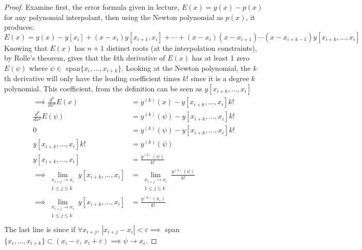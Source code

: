 \documentclass{article}
\begin{document}
\begin{enumerate}
\begin{enumerate}
                \begin{proof}
                    Examine first, the error formula given in lecture, $E(x) = y(x) - p(x)$ for any polynomial interpolant, then using the Newton polynomial as $p(x)$, it produces:
                    \[ E(x) = y(x) - y[x_i] + (x-x_i)y[x_{i+1},x_i] + \cdots + (x - x_i)(x - x_{i+1}) \cdots(x - x_{i + k-1})y[x_{i + k},\dots,x_i]\]
                    Knowing that $E(x)$ has $n+1$ distinct roots (at the interpolation constraints), by Rolle's theorem, gives that the $k$th derivative of $E(x)$ has at least 1 zero $E(\psi)$ where $\psi \in$ span$\{x_i,\dots,x_{i+k}\}$. Looking at the Newton polynomial, the $k$th derivative will only have the leading coefficient times $k!$ since it is a degree $k$ polynomial. This coefficient, from the definition can be seen as $y[x_{i+k},\dots,x_i]$
                    \begin{align*} 
                        \implies \frac{d^k}{dx^k} E(x) &= y^{(k)}(x) - y[x_{i+k},\dots,x_i]k!  \\
                        \frac{d^k}{dx^k} E(\psi) &= y^{(k)}(\psi) - y[x_{i+k},\dots,x_i]k!  \\
                        0 &= y^{(k)}(\psi) - y[x_{i+k},\dots,x_i]k!  \\
                        y[x_{i+k},\dots,x_i]k! &= y^{(k)}(\psi) \\
                        y[x_{i+k},\dots,x_i] &= \frac{y^{(k)}(\psi)}{k!} \\
                        \implies \lim_{\substack{x_{i+j} \rightarrow x_i \\ 1 \leq j \leq k}} y[x_{i+k},\dots,x_i] &= \lim_{\substack{x_{i+j} \rightarrow x_i \\ 1 \leq j \leq k}} \frac{y^{(k)}(\psi)}{k!} \\
                        \implies \lim_{\substack{x_{i+j} \rightarrow x_i \\ 1 \leq j \leq k}} y[x_{i+k},\dots,x_i] &= \frac{y^{(k)}(x_i)}{k!} \\
                    \end{align*}
                    The last line is since if $\forall x_{i+j},\, |x_{i+j} - x_i| < \varepsilon \implies$ span$\{x_i,\dots,x_{i+k}\} \subset (x_i - \varepsilon,\, x_i + \varepsilon) \implies \psi \rightarrow x_i$.


\end{proof}
\end{enumerate}
\end{enumerate}
\end{document}
